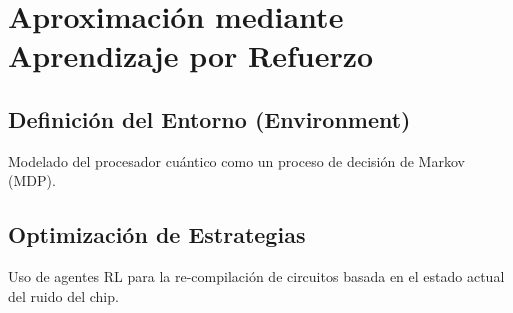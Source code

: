 \chapter{Aproximación mediante Aprendizaje por Refuerzo}
\label{cap:rl}

\section{Definición del Entorno (Environment)}
Modelado del procesador cuántico como un proceso de decisión de Markov (MDP).

\section{Optimización de Estrategias}
Uso de agentes RL para la re-compilación de circuitos basada en el estado actual del ruido del chip.